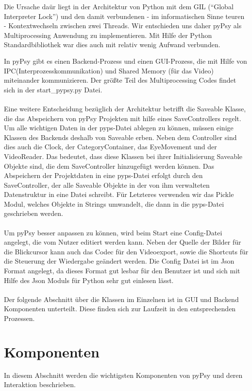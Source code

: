 \documentclass[a4paper,draft]{scrartcl}
\begin{document}
Die Ursache da\"ur liegt in der Architektur von Python mit dem GIL ("`Global Interpreter Lock"') und den damit verbundenen - im informatischen Sinne teuren - Kontextwechseln zwischen zwei Threads.
Wir entschieden uns daher pyPsy als Multiprocessing Anwendung zu implementieren.
Mit Hilfe der Python Standardbibliothek war dies auch mit relativ wenig Aufwand verbunden.

In pyPsy gibt es einen Backend-Prozess und einen GUI-Prozess, die mit Hilfe von IPC(Interprozesskommunikation) und Shared Memory (für das Video) miteinander kommunizieren.
Der gr\"o\ss te Teil des Multiprocessing Codes findet sich in der start\_pypsy.py Datei.
\\ \\
Eine weitere Entscheidung bezüglich der Architektur betrifft die Saveable Klasse, die das Abspeichern von pyPsy Projekten mit hilfe eines SaveControllers regelt. Um alle wichtigen Daten in der pyps-Datei ablegen zu können, müssen einige Klassen des Backends deshalb von Saveable erben. Neben dem Controller sind dies auch die Clock, der CategoryContainer, das EyeMovement und der VideoReader. Das bedeutet, dass diese Klassen bei ihrer Initialisierung Saveable Objekte sind, die dem SaveController hinzugefügt werden können. Das Abspeichern der Projektdaten in eine pyps-Datei erfolgt durch den SaveController, der alle Saveable Objekte in der von ihm verwalteten Datenstruktur in eine Datei schreibt. Für Letzteres verwenden wir das Pickle Modul, welches Objekte in Strings umwandelt, die dann in die pyps-Datei geschrieben werden. 
\\ \\
Um pyPsy besser anpassen zu können, wird beim Start eine Config-Datei angelegt, die vom Nutzer editiert werden kann. Neben der Quelle der Bilder für die Blickcursor kann auch das Codec für den Videoexport, sowie die Shortcuts für die Steuerung der Wiedergabe geändert werden. Die Config Datei ist im Json Format angelegt, da dieses Format gut lesbar für den Benutzer ist und sich mit Hilfe des Json Moduls für Python sehr gut einlesen lässt. 
\\ \\
Der folgende Abschnitt über die Klassen im Einzelnen ist in GUI und Backend Komponenten unterteilt.
Diese finden sich zur Laufzeit in den entsprechenden Prozessen.

\section{Komponenten}
In diesem Abschnitt werden die wichtigsten Komponenten von pyPsy und deren Interaktion beschrieben.
\end{document}
